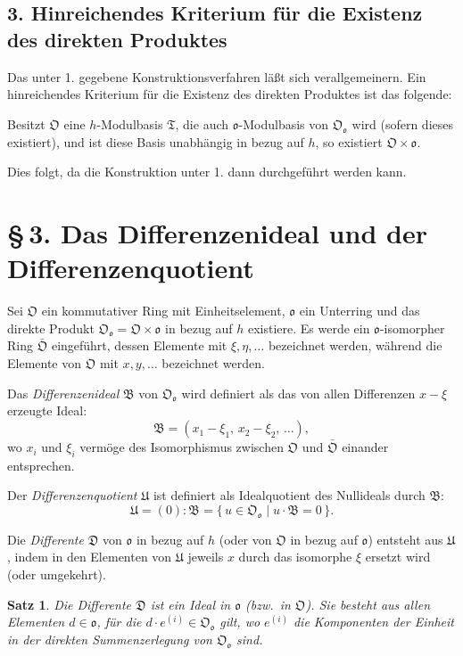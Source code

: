\documentclass[10pt,a4paper]{article}
\theoremstyle{plain}
\newtheorem{satz}{Satz}[section]
\theoremstyle{definition}
\theoremstyle{remark}
\newcommand{\ido}{\mathfrak{o}}
\newcommand{\idD}{\mathfrak{D}}
\newcommand{\idB}{\mathfrak{B}}
\newcommand{\cO}{\mathfrak{O}}
\begin{document}
\subsection*{3. Hinreichendes Kriterium f\"ur die Existenz des direkten Produktes}

Das unter 1. gegebene Konstruktionsverfahren l\"a\ss t sich verallgemeinern. Ein hinreichendes Kriterium f\"ur die Existenz des direkten Produktes ist das folgende:

Besitzt $\cO$ eine $h$-Modulbasis $\mathfrak{T}$, die auch $\ido$-Modulbasis von $\cO_{\ido}$ wird (sofern dieses existiert), und ist diese Basis unabh\"angig in bezug auf $h$, so existiert $\cO \times \ido$.

Dies folgt, da die Konstruktion unter 1. dann durchgef\"uhrt werden kann.

\newpage
\section*{\S\,3. Das Differenzenideal und der Differenzenquotient}

Sei $\cO$ ein kommutativer Ring mit Einheitselement, $\ido$ ein Unterring und das direkte Produkt $\cO_{\ido} = \cO \times \ido$ in bezug auf $h$ existiere. Es werde ein $\ido$-isomorpher Ring $\bar{\cO}$ eingef\"uhrt, dessen Elemente mit $\xi, \eta, \ldots$ bezeichnet werden, w\"ahrend die Elemente von $\cO$ mit $x, y, \ldots$ bezeichnet werden.

Das \emph{Differenzenideal} $\idB$ von $\cO_{\ido}$ wird definiert als das von allen Differenzen $x - \xi$ erzeugte Ideal:
\[
\idB = (x_1 - \xi_1,\, x_2 - \xi_2,\, \ldots),
\]
wo $x_i$ und $\xi_i$ verm\"oge des Isomorphismus zwischen $\cO$ und $\bar{\cO}$ einander entsprechen.

Der \emph{Differenzenquotient} $\mathfrak{U}$ ist definiert als Idealquotient des Nullideals durch $\idB$:
\[
\mathfrak{U} = (0) : \idB = \{\, u \in \cO_{\ido} \mid u \cdot \idB = 0 \,\}.
\]

Die \emph{Differente} $\idD$ von $\ido$ in bezug auf $h$ (oder von $\cO$ in bezug auf $\ido$) entsteht aus $\mathfrak{U}$, indem in den Elementen von $\mathfrak{U}$ jeweils $x$ durch das isomorphe $\xi$ ersetzt wird (oder umgekehrt).

\begin{satz}
Die Differente $\idD$ ist ein Ideal in $\ido$ (bzw.\ in $\cO$). Sie besteht aus allen Elementen $d \in \ido$, f\"ur die $d \cdot e^{(i)} \in \cO_{\ido}$ gilt, wo $e^{(i)}$ die Komponenten der Einheit in der direkten Summenzerlegung von $\cO_{\ido}$ sind.
\end{satz}
\end{document}
